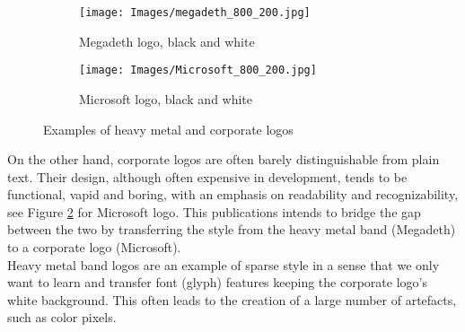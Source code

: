 \documentclass[a4paper,twoside]{article}
\begin{document}
\begin{figure*}
    \centering
     \begin{subfigure}{.5\textwidth}
     \centering
     \texttt{[image: Images/megadeth\_800\_200.jpg]}
     \caption{Megadeth logo, black and white}
          \label{fig:megadeth}
      \end{subfigure}\hfill
     \begin{subfigure}{.5\textwidth}
     \centering
     \texttt{[image: Images/Microsoft\_800\_200.jpg]}
     \caption{Microsoft logo, black and white}
          \label{fig:microsoft}
     \end{subfigure}
    \caption{Examples of heavy metal and corporate logos}
    \label{fig:logos}
\end{figure*}

\noindent On the other hand, corporate logos are often barely distinguishable from plain text. Their design, although often expensive in development, tends to be functional, vapid and boring, with an emphasis on readability and recognizability, see Figure \ref{fig:microsoft} for Microsoft logo. This publications intends to bridge the gap between the two by transferring the style from the heavy metal band (Megadeth) to a corporate logo (Microsoft).\\

\noindent Heavy metal band logos are an example of sparse style in a sense that we only want to learn and transfer font (glyph) features keeping the corporate logo's white background. This often leads to the creation of a large number of artefacts, such as color pixels. 
\end{document}
